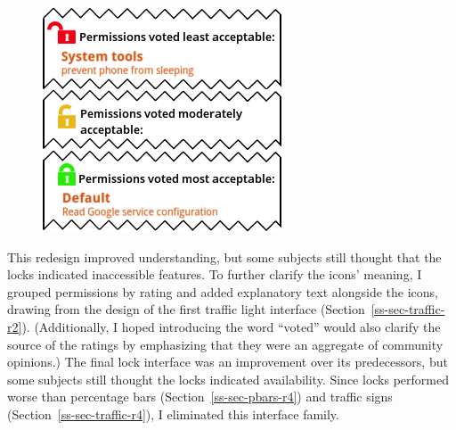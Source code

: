 \documentclass[11pt]{article}
\newcommand{\refsec}[1]{Section~\ref{#1}}
\begin{document}
\begin{figure}
\begin{center}
\includegraphics[width=.9\linewidth]{candidate-img/locks/locksR4.png}
\end{center}
\end{figure}

This redesign improved understanding, but 
some subjects still thought that the locks indicated inaccessible features.
To further clarify the icons' meaning, I grouped 
permissions by rating and added explanatory 
text alongside the icons, drawing 
from the design of the first traffic light interface 
(\refsec{ss-sec-traffic-r2}).
(Additionally, I hoped introducing the word ``voted'' 
would also clarify the source of the ratings by emphasizing that they 
were an aggregate of community opinions.)
\label{ss-sec-locks-r4}
The final lock interface was an improvement over its 
predecessors, 
but some subjects still thought the locks indicated 
availability. Since locks 
performed worse than percentage bars (\refsec{ss-sec-pbars-r4}) 
and traffic signs (\refsec{ss-sec-traffic-r4}), 
I eliminated this interface family.
\end{document}
